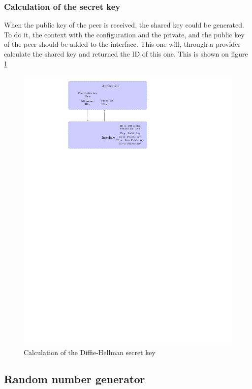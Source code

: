 \subsubsection*{Calculation of the secret key}

When the public key of the peer is received, the shared key could be generated.
To do it, the context with the configuration and the private, and the public key
of the peer should be added to the interface. This one will, through a provider
calculate the shared key and returned the ID of this one. This is shown on
figure \ref{fig:gci_dh_calc_key}

\begin{figure}[!ht]
\centering
\includegraphics[trim=8.5cm 20cm 13cm 0cm]{figures/gci_dh_calc_key.pdf}
\caption{Calculation of the Diffie-Hellman secret key}
\label{fig:gci_dh_calc_key}
\end{figure}


\subsection{Random number generator}
\label{gci_rng}

